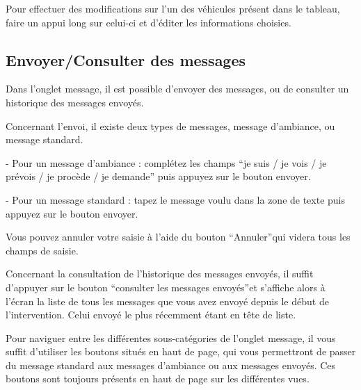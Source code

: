 \documentclass{article}
\begin{document}
\vspace{13pt}
{\color{color01} Pour effectuer des modifications sur l'un des véhicules présent 
dans le tableau, faire un appui long sur celui-ci et d'éditer les informations 
choisies.\label{h.s3x5hbwvt5fa}}

\vspace{18pt}
\subsection*{{\large {\color{color01} \textbf{Envoyer/Consulter des messages}}}}

\vspace{13pt}
{\color{color01} Dans l'onglet message, il est possible d'envoyer des messages, 
ou de consulter un historique des messages envoyés.}

\vspace{13pt}
{\color{color01} Concernant l'envoi, il existe deux types de messages, message 
d'ambiance, ou message standard.}

\parindent=18pt
{\color{color01} - Pour un message d'ambiance : complétez les champs ``je suis 
/ je vois / je prévois / je procède / je demande'' puis appuyez sur le bouton 
envoyer.}

{\color{color01} - Pour un message standard : tapez le message voulu dans la zone 
de texte puis appuyez sur le bouton envoyer.}

\vspace{13pt}
\parindent=0pt
{\color{color01} Vous pouvez annuler votre saisie à l'aide du bouton ``Annuler''qui 
videra tous les champs de saisie.}

\vspace{13pt}
{\color{color01} Concernant la consultation de l'historique des messages envoyés, 
il suffit d'appuyer sur le bouton ``consulter les messages envoyés''et s'affiche 
alors à l'écran la liste de tous les messages que vous avez envoyé depuis le 
début de l'intervention. Celui envoyé le plus récemment étant en tête de liste. 
}

\vspace{13pt}
{\color{color01} Pour naviguer entre les différentes sous-catégories de l'onglet 
message, il vous suffit d'utiliser les boutons situés en haut de page, qui vous 
permettront de passer du message standard aux messages d'ambiance ou aux messages 
envoyés.  Ces boutons sont toujours présents en haut de page sur les différentes 
vues. }
\end{document}
